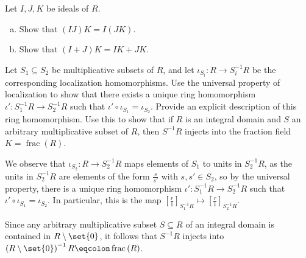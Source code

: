 \documentclass[10pt]{mypackage}
\begin{document}
\RaggedRight
\begin{problem}[Problem 1]
  Let $I,J,K$ be ideals of $R$.
  \begin{enumerate}[(a)]
    \item Show that $\left( IJ \right)K = I\left( JK \right)$.
    \item Show that $\left( I + J \right)K = IK + JK$.
  \end{enumerate}
\end{problem}

\begin{problem}[Problem 4]
  Let $S_1\subseteq S_2$ be multiplicative subsets of $R$, and let $\iota_{S_i}\colon R\rightarrow S_i^{-1}R$ be the corresponding localization homomorphisms. Use the universal property of localization to show that there exists a unique ring homomorphism $\iota'\colon S_1^{-1}R\rightarrow S_2^{-1}R$ such that $\iota'\circ \iota_{S_1} = \iota_{S_2}$. Provide an explicit description of this ring homomorphism. Use this to show that if $R$ is an integral domain and $S$ an arbitrary multiplicative subset of $R$, then $S^{-1}R$ injects into the fraction field $K = \operatorname{frac}\left( R \right)$.
\end{problem}
\begin{solution}
  We observe that $\iota_{S_2}\colon R\rightarrow S_{2}^{-1}R$ maps elements of $S_1$ to units in $S_2^{-1}R$, as the units in $S_2^{-1}R$ are elements of the form $ \frac{s}{s'} $ with $s,s'\in S_2$, so by the universal property, there is a unique ring homomorphism $\iota'\colon S_1^{-1}R\rightarrow S_2^{-1}R$ such that $\iota'\circ \iota_{S_1} = \iota_{S_2}$. In particular, this is the map $ \left[ \frac{r}{1} \right]_{S_1^{-1}R} \mapsto \left[ \frac{r}{1} \right]_{S_2^{-1}R} $.\newline

  Since any arbitrary multiplicative subset $S\subseteq R$ of an integral domain is contained in $R\setminus \set{0}$, it follows that $S^{-1}R$ injects into $ \left( R\setminus \set{0} \right)^{-1}R \eqcolon \operatorname{frac}\left( R \right) $.
\end{solution}
\end{document}
